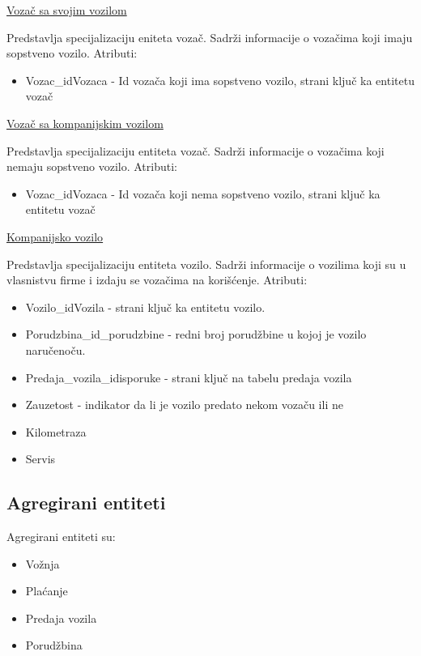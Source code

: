 \begin{flushleft}
\underline{Vozač sa svojim vozilom}
\end{flushleft}
Predstavlja specijalizaciju eniteta vozač. Sadrži informacije o vozačima koji imaju sopstveno vozilo. Atributi:
\begin{itemize}
    \item Vozac\_idVozaca - Id vozača koji ima sopstveno vozilo, strani ključ ka entitetu vozač
\end{itemize}

\begin{flushleft}
\underline{Vozač sa kompanijskim vozilom}
\end{flushleft}
Predstavlja specijalizaciju entiteta vozač. Sadrži informacije o vozačima koji nemaju sopstveno vozilo. Atributi:
\begin{itemize}
    \item Vozac\_idVozaca - Id vozača koji nema sopstveno vozilo, strani ključ ka entitetu vozač
\end{itemize}

\begin{flushleft}
\underline{Kompanijsko vozilo}
\end{flushleft}
Predstavlja specijalizaciju entiteta vozilo. Sadrži informacije o vozilima koji su u vlasnistvu firme i izdaju se vozačima na korišćenje. Atributi:
\begin{itemize}
    \item Vozilo\_idVozila - strani ključ ka entitetu vozilo.
    \item Porudzbina\_id\_porudzbine - redni broj porudžbine u kojoj je vozilo naručenoču.
    \item Predaja\_vozila\_idisporuke - strani ključ na tabelu predaja vozila
    \item Zauzetost - indikator da li je vozilo predato nekom vozaču ili ne
    \item Kilometraza
    \item Servis
\end{itemize}


\subsection{\textbf{Agregirani entiteti}}
Agregirani entiteti su:
\begin{itemize}
    \item Vožnja
    \item Plaćanje
    \item Predaja vozila
    \item Porudžbina
\end{itemize}

